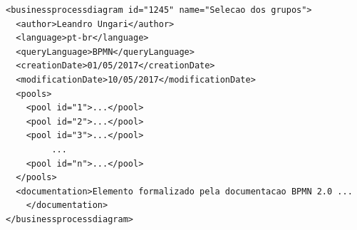 \lstset{language=XML}
\begin{lstlisting}[caption=Estrutura do XML da classe diagrama BPM, label=xml]
<businessprocessdiagram id="1245" name="Selecao dos grupos">
  <author>Leandro Ungari</author>
  <language>pt-br</language>
  <queryLanguage>BPMN</queryLanguage>
  <creationDate>01/05/2017</creationDate>
  <modificationDate>10/05/2017</modificationDate>
  <pools>
    <pool id="1">...</pool>
    <pool id="2">...</pool>
    <pool id="3">...</pool>
         ...
    <pool id="n">...</pool>
  </pools>
  <documentation>Elemento formalizado pela documentacao BPMN 2.0 ...
	</documentation>
</businessprocessdiagram>
\end{lstlisting}




